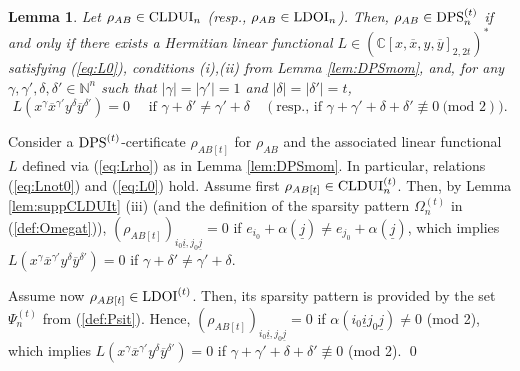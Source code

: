 \documentclass[11pt]{article}
\makeatletter
\newcommand{\N}{\ensuremath{\mathbb{N}}}   %
\newcommand{\C}{\ensuremath{\mathbb{C}}} %
\newcommand{\CLDUI}{\text{\rm CLDUI}}
\newcommand{\LDOI}{\text{\rm LDOI}}
\newcommand{\DPS}{\text{\rm DPS}}
\newcommand{\ox}{\overline x}
\newcommand{\oy}{\overline y}
\newcommand{\ot}{\otimes}
\newcommand{\ui}{\underline{i}}
\newcommand{\uj}{\underline{j}}
\theoremstyle{plain}
\newtheorem{lemma}[satz]{Lemma}
\renewenvironment{proof}[1][\proofname]{%
  \par
  \pushQED{}%
  \normalfont
  \topsep6\p@\@plus6\p@
  \trivlist
  \item[\hskip\labelsep\itshape #1\@addpunct{.}]%
}{%
  \popQED
  \endtrivlist
}
\makeatother
\begin{document}
\begin{lemma}\label{lem:DPS-mom-LDOI}
 Let $\rho_{AB}\in\CLDUI_n$ (resp.,  $\rho_{AB}\in\LDOI_n$).
Then,     $\rho_{AB}\in\DPS^{(t)}_n$ if and only if there exists a Hermitian linear functional 
$L\in (\C[x,\ox,y,\oy]_{2,2t})^*$ satisfying   (\ref{eq:L0}),   conditions (i),(ii) from Lemma \ref{lem:DPSmom}, and, for any $\gamma,\gamma',\delta,\delta'\in \N^n$ such that $ |\gamma|=|\gamma'|=1$ and $ |\delta|=|\delta'|=t$,
      $$L(x^\gamma\ox^{\gamma'}y^\delta\oy^{\delta'}) = 0\quad 
      \text{ if } \gamma+\delta'\not=\gamma'+\delta \quad (\text{resp., if } \gamma+\gamma'+\delta+\delta'\not\equiv 0 \ \text{(mod } 2)).           $$
\end{lemma}

\begin{proof}
Consider a $\DPS^{(t)}$-certificate $\rho_{AB[t]}$ for $\rho_{AB}$ and the associated linear functional $L$ defined via (\ref{eq:Lrho}) as in Lemma \ref{lem:DPSmom}. In particular, relations (\ref{eq:Lnot0}) and (\ref{eq:L0}) hold.
    Assume first  $\rho_{AB[t]}\in\CLDUI^{(t)}_n$. Then, by   Lemma \ref{lem:suppCLDUIt} (iii) (and the definition of the sparsity pattern $\Omega^{(t)}_n$ in (\ref{def:Omegat})), $(\rho_{AB[t]})_{i_0\ui,j_0\uj}=0$  if $e_{i_0}+\alpha(\uj)\not=e_{j_0}+\alpha(\uj)$, which implies 
    $L(x^\gamma \ox^{ \gamma'}    y^\delta \oy^{\delta'})=0$ if $\gamma+\delta'\not=\gamma'+\delta$.   %
    
    Assume now $\rho_{AB[t]}\in\LDOI^{(t)}$. Then, its sparsity pattern is provided by the set $\Psi^{(t)}_n$ from  (\ref{def:Psit}). Hence,   $(\rho_{AB[t]})_{i_0\ui,j_0\uj}=0$ if $\alpha(i_0\ui j_0\uj)\ne 0$ (mod 2), which implies $L(x^\gamma \ox^{ \gamma'}    y^\delta \oy^{\delta'})    =0$ if 
    $\gamma+\gamma'+\delta+\delta'\not\equiv 0    $ (mod 2).
\qed\end{proof}
\end{document}
